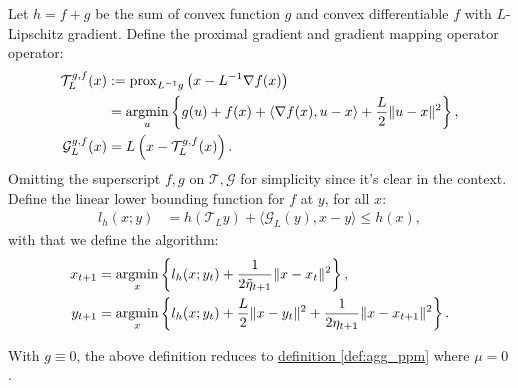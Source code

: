 \documentclass[12pt]{article}
\begin{document}
            \begin{definition}
            \label{def:ag_prox_grad_ppm}
                Let $h=f + g$ be the sum of convex function $g$ and convex differentiable $f$ with $L$-Lipschitz gradient. 
                Define the proximal gradient and gradient mapping operator operator: 
                $$
                \begin{aligned}
                    \mathcal T_L^{g, f}(x) &:=  
                    \operatorname{prox}_{L^{-1}g}\left(x - L^{-1}\nabla f(x)\right)
                    \\
                    &= 
                    \mathop{\rm argmin}\limits_{u}
                    \left\lbrace
                        g(u) + f(x) + \langle \nabla f(x), u - x\rangle
                        + 
                        \frac{L}{2}\Vert u - x\Vert^2
                    \right\rbrace,
                    \\
                    \mathcal G_L^{g, f}(x) &= 
                    L\left(x - \mathcal T_L^{g, f}(x)\right). 
                \end{aligned}
                $$
                Omitting the superscript $f, g$ on $\mathcal T, \mathcal G$ for simplicity since it's clear in the context. 
                Define the linear lower bounding function for $f$ at $y$, for all $x$: 
                $$
                \begin{aligned}
                    l_h(x; y) &= h(\mathcal T_L y) + \langle \mathcal G_L(y), x - y \rangle \le h(x), 
                \end{aligned}
                $$
                with that we define the algorithm:
                $$
                \begin{aligned}
                    x_{t + 1} &= \mathop{\rm argmin}\limits_{x} \left\lbrace
                        l_h(x; y_t) + \frac{1}{2\tilde \eta_{t + 1}} 
                        \Vert x - x_t\Vert^2
                    \right\rbrace,
                    \\
                    y_{t + 1}&= 
                    \mathop{\rm argmin}\limits_{x}
                    \left\lbrace
                        l_h(x; y_t) + \frac{L}{2}\Vert x - y_t\Vert^2 + 
                        \frac{1}{2\eta_{t + 1}} \Vert x - x_{t + 1}\Vert^2
                    \right\rbrace.
                \end{aligned}
                $$
            \end{definition}
            \begin{observation}
                With $g \equiv 0$, the above definition reduces to 
                \hyperref[def:agg_ppm]{definition \ref*{def:agg_ppm}}
                where $\mu = 0$. 
            \end{observation}
\end{document}
